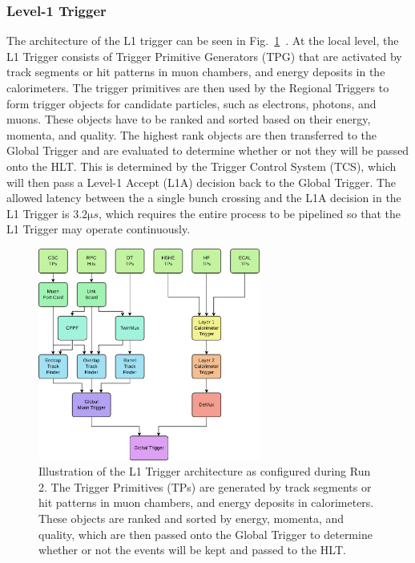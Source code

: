 \subsubsection{Level-1 Trigger}

The architecture of the L1 trigger can be seen in Fig.~\ref{fig:L1Trigger}~\cite{cmscollaboration2020performance}.
At the local level, the L1 Trigger consists of Trigger Primitive Generators (TPG) that are activated by track segments or hit patterns in muon chambers, and energy deposits in the calorimeters.
The trigger primitives are then used by the Regional Triggers to form trigger objects for candidate particles, such as electrons, photons, and muons.
These objects have to be ranked and sorted based on their energy, momenta, and quality.
The highest rank objects are then transferred to the Global Trigger and are evaluated to determine whether or not they will be passed onto the HLT.
This is determined by the Trigger Control System (TCS), which will then pass a Level-1 Accept (L1A) decision back to the Global Trigger.
The allowed latency between the a single bunch crossing and the L1A decision in the L1 Trigger is $3.2\unit{\micro s}$, which requires the entire process to be pipelined so that the L1 Trigger may operate continuously.

\begin{figure}[htbp]
  \centering
  \includegraphics[width=0.65\textwidth]{fig/experiment/cms_L1trigger.pdf}
  \caption{
    Illustration of the L1 Trigger architecture as configured during Run 2.
    The Trigger Primitives (TPs) are generated by track segments or hit patterns in muon chambers, and energy deposits in calorimeters.
    These objects are ranked and sorted by energy, momenta, and quality, which are then passed onto the Global Trigger to determine whether or not the events will be kept and passed to the HLT. 
  }
  \label{fig:L1Trigger}
\end{figure}

